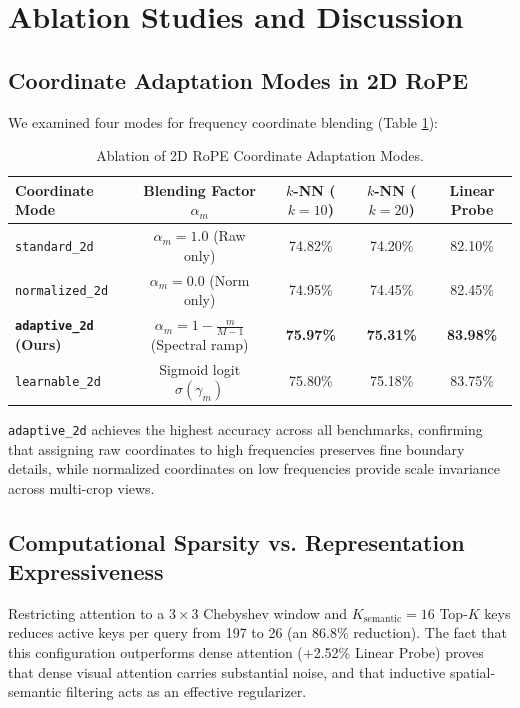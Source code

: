 \documentclass[11pt,a4paper]{article}
\begin{document}
\section{Ablation Studies and Discussion}
\label{sec:ablations}

\subsection{Coordinate Adaptation Modes in 2D RoPE}
We examined four modes for frequency coordinate blending (Table \ref{tab:rope_modes}):
\begin{table}[ht]
\centering
\small
\setlength{\tabcolsep}{5pt}
\caption{Ablation of 2D RoPE Coordinate Adaptation Modes.}
\label{tab:rope_modes}
\begin{tabular}{lcccc}
\toprule
\textbf{Coordinate Mode} & \textbf{Blending Factor $\alpha_m$} & \textbf{$k$-NN ($k=10$)} & \textbf{$k$-NN ($k=20$)} & \textbf{Linear Probe} \\
\midrule
\texttt{standard\_2d} & $\alpha_m = 1.0$ (Raw only) & 74.82\% & 74.20\% & 82.10\% \\
\texttt{normalized\_2d} & $\alpha_m = 0.0$ (Norm only) & 74.95\% & 74.45\% & 82.45\% \\
\textbf{\texttt{adaptive\_2d} (Ours)} & $\alpha_m = 1 - \frac{m}{M-1}$ (Spectral ramp) & \textbf{75.97\%} & \textbf{75.31\%} & \textbf{83.98\%} \\
\texttt{learnable\_2d} & Sigmoid logit $\sigma(\gamma_m)$ & 75.80\% & 75.18\% & 83.75\% \\
\bottomrule
\end{tabular}
\end{table}

\noindent\texttt{adaptive\_2d} achieves the highest accuracy across all benchmarks, confirming that assigning raw coordinates to high frequencies preserves fine boundary details, while normalized coordinates on low frequencies provide scale invariance across multi-crop views.

\subsection{Computational Sparsity vs. Representation Expressiveness}
Restricting attention to a $3\times 3$ Chebyshev window and $K_{\text{semantic}}=16$ Top-$K$ keys reduces active keys per query from 197 to 26 (an 86.8\% reduction). The fact that this configuration outperforms dense attention (+2.52\% Linear Probe) proves that dense visual attention carries substantial noise, and that inductive spatial-semantic filtering acts as an effective regularizer.
\end{document}

